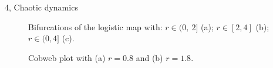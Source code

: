 \documentclass[10pt,a4paper]{article}
\begin{document}
\begin{task}{4, Chaotic dynamics}
\begin{figure}[b]
    \centering
    \hfill
    \hfill
    \caption{Bifurcations of the logistic map with:
    $r \in (0,\ 2]$ (a);
    $r \in [2, 4]$ (b);
    $r \in (0, 4]$ (c).}
    \label{fig:logistic-bifurcs}
\end{figure}

\begin{figure}[t]
    \centering
    \hfill
    \caption{Cobweb plot with (a) $r = 0.8$ and (b) $r = 1.8$.}
    \label{fig:cobweb-4.1}
\end{figure}


\end{task}
\end{document}
